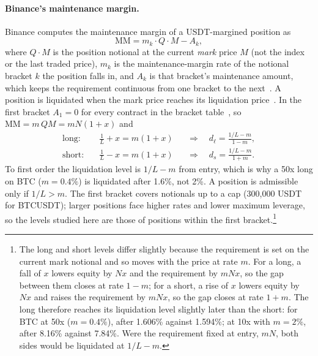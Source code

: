 \paragraph{Binance's maintenance margin.} Binance computes the maintenance margin of a USDT-margined
position as
\begin{equation}
\mathrm{MM} = m_k \cdot Q \cdot M - A_k,
\end{equation}
where $Q\cdot M$ is the position notional at the current \emph{mark} price $M$ (not the index or the
last traded price), $m_k$ is the maintenance-margin rate of the notional bracket $k$ the position falls
in, and $A_k$ is that bracket's maintenance amount, which keeps the requirement continuous from one
bracket to the next~\cite{binance-margin,binance-liqprice}. A position is liquidated when the mark
price reaches its liquidation price~\cite{binance-liq}. In the first bracket $A_1=0$ for every
contract in the bracket table~\cite{binance-brackets}, so $\mathrm{MM}=m\,QM=mN(1+x)$ and
\begin{align}
\text{long:}\quad & \tfrac{1}{L} + x = m(1+x) &&\Longrightarrow\quad d_\ell = \frac{1/L - m}{1-m},\\
\text{short:}\quad & \tfrac{1}{L} - x = m(1+x) &&\Longrightarrow\quad d_s = \frac{1/L - m}{1+m}.
\end{align}
To first order the liquidation level is $1/L-m$ from entry, which is why a 50x long on BTC
($m=0.4\%$) is liquidated after 1.6\%, not 2\%. A position is admissible only if $1/L>m$. The first
bracket covers notionals up to a cap (300{,}000 USDT for BTCUSDT); larger positions face higher rates
and lower maximum leverage, so the levels studied here are those of positions within the first
bracket.\footnote{The long and short levels differ slightly because the requirement is set on the
current mark notional and so moves with the price at rate $m$. For a long, a fall of $x$ lowers equity
by $Nx$ and the requirement by $mNx$, so the gap between them closes at rate $1-m$; for a short, a rise
of $x$ lowers equity by $Nx$ and raises the requirement by $mNx$, so the gap closes at rate $1+m$. The
long therefore reaches its liquidation level slightly later than the short: for BTC at 50x
($m=0.4\%$), after 1.606\% against 1.594\%; at 10x with $m=2\%$, after 8.16\% against 7.84\%. Were
the requirement fixed at entry, $mN$, both sides would be liquidated at $1/L-m$.}

